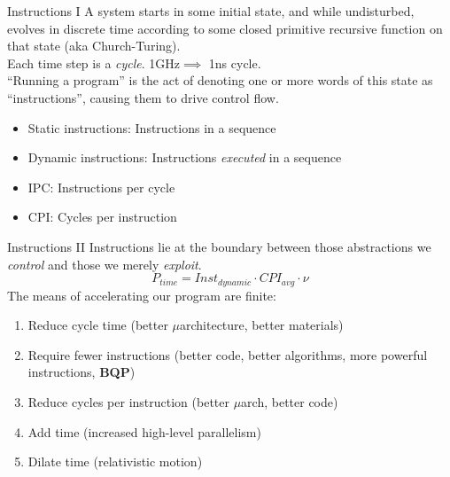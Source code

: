 \documentclass[xcolor={dvipsnames,table}]{beamer}
\begin{document}
\begin{frame}{Instructions I}
A system starts in some initial state, and while undisturbed, evolves
in discrete time according to some closed primitive recursive function on that state (aka Church-Turing).\\
\vspace{.25in}
Each time step is a \textit{cycle}. 1GHz$\implies$ 1ns cycle.\\
\vspace{.25in}
``Running a program'' is the act of denoting one or more words of this state
as ``instructions'', causing them to drive control flow.
\vspace{.25in}
\begin{itemize}
\item Static instructions: Instructions in a sequence
\item Dynamic instructions: Instructions \textit{executed} in a sequence
\item IPC: Instructions per cycle
\item CPI: Cycles per instruction
\end{itemize}
\end{frame}

\begin{frame}{Instructions II}
Instructions lie at the boundary between those abstractions we \textit{control} and those
we merely \textit{exploit}.
\begin{equation}
P_{time} = Inst_{dynamic}\cdot CPI_{avg}\cdot\nu
\end{equation}
The means of accelerating our program are finite:
\begin{enumerate}
\item Reduce cycle time (better $\mu$architecture, better materials)
\item Require fewer instructions (better code, better algorithms, more powerful instructions, \textbf{BQP})
\item Reduce cycles per instruction (better $\mu$arch, better code)
\item Add time (increased high-level parallelism)
\item Dilate time (relativistic motion)
\end{enumerate}
\end{frame}
\end{document}
